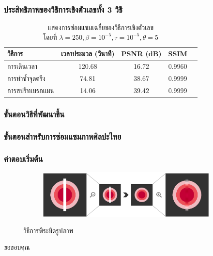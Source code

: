 \documentclass[xcolor=dvipsnames, xetex,serif]{beamer}
\numberwithin{equation}{section}
\begin{document}
	\begin{frame}
		\frametitle{ประสิทธิภาพของวิธีการเชิงตัวเลขทั้ง 3 วิธี}
		\begin{table}[H]
		\centering
		\captionsetup{justification=centering}
			\begin{tabular}[ht]{|l|c|c|c|c|}
				\hline
				วิธีการ  & เวลาประมวล  (วินาที) & PSNR (dB) & SSIM \\
				\hline
				การเดินเวลา & 120.68 & 16.72 & 0.9960 \\
				การทำซ้ำจุดตรึง & 74.81 & 38.67 & 0.9999 \\
				การสปริทเบรกแมน & 14.06 & 39.42 & 0.9999  \\
				\hline
			\end{tabular}
		\caption{แสดงการซ่อมแซมเฉลี่ยของวิธีการเชิงตัวเลข \\ โดยที่ $\lambda = 250, \beta = 10^{-5}, \tau = 10^{-5}, \theta = 5 $}
		\end{table}	
	\end{frame}
	\begin{frame}
		\frametitle{ขั้นตอนวิธีที่พัฒนาขึ้น}

	\end{frame}
	\begin{frame}
		\frametitle{ขั้นตอนสำหรับการซ่อมแซมภาพศิลปะไทย}
	\end{frame}
	\begin{frame}
		\frametitle{คำตอบเริ่มต้น}
		\begin{figure}[H]
			\centering
			\begin{subfigure}{0.8\linewidth}
				\centering
				\includegraphics[width=1\linewidth]{images/image_inital_solution.png}
			\end{subfigure}
			\caption{วิธีการพีระมิดรูปภาพ}
		\end{figure}
	\end{frame}
	\begin{frame}
		\centering
		\Huge{ขอขอบคุณ}
	\end{frame}
\end{document}
